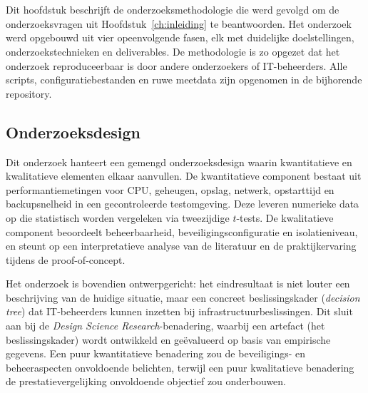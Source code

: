 
\chapter{}%
\label{ch:methodologie}

Dit hoofdstuk beschrijft de onderzoeksmethodologie die werd gevolgd om de onderzoeksvragen uit Hoofdstuk~\ref{ch:inleiding} te beantwoorden. Het onderzoek werd opgebouwd uit vier opeenvolgende fasen, elk met duidelijke doelstellingen, onderzoekstechnieken en deliverables. De methodologie is zo opgezet dat het onderzoek reproduceerbaar is door andere onderzoekers of IT-beheerders. Alle scripts, configuratiebestanden en ruwe meetdata zijn opgenomen in de bijhorende repository.

\section{Onderzoeksdesign}
\label{sec:onderzoeksdesign}

Dit onderzoek hanteert een gemengd onderzoeksdesign waarin kwantitatieve en kwalitatieve elementen elkaar aanvullen. De kwantitatieve component bestaat uit performantiemetingen voor CPU, geheugen, opslag, netwerk, opstarttijd en backupsnelheid in een gecontroleerde testomgeving. Deze leveren numerieke data op die statistisch worden vergeleken via tweezijdige $t$-tests. De kwalitatieve component beoordeelt beheerbaarheid, beveiligingsconfiguratie en isolatieniveau, en steunt op een interpretatieve analyse van de literatuur en de praktijkervaring tijdens de proof-of-concept.

Het onderzoek is bovendien ontwerpgericht: het eindresultaat is niet louter een beschrijving van de huidige situatie, maar een concreet beslissingskader (\textit{decision tree}) dat IT-beheerders kunnen inzetten bij infrastructuurbeslissingen. Dit sluit aan bij de \textit{Design Science Research}-benadering, waarbij een artefact (het beslissingskader) wordt ontwikkeld en geëvalueerd op basis van empirische gegevens. Een puur kwantitatieve benadering zou de beveiligings- en beheeraspecten onvoldoende belichten, terwijl een puur kwalitatieve benadering de prestatievergelijking onvoldoende objectief zou onderbouwen.

